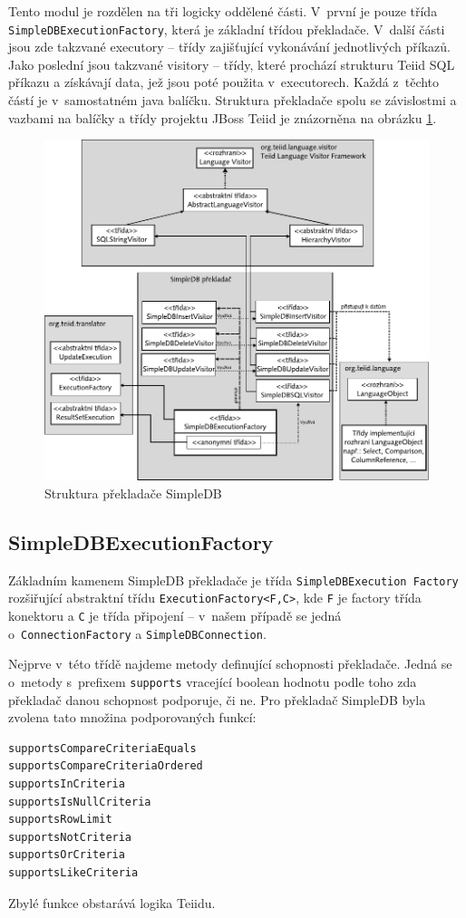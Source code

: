 \documentclass[oneside,12pt]{fithesis2}
\begin{document}
Tento modul je rozdělen na tři logicky oddělené části. V~první je pouze třída \texttt{SimpleDBExecutionFactory}, která je základní třídou překladače. V~další části jsou zde takzvané executory -- třídy zajišťující vykonávání jednotlivých příkazů. Jako poslední jsou takzvané visitory -- třídy, které prochází strukturu Teiid SQL příkazu a získávají data, jež jsou poté použita v~executorech. Každá z~těchto částí je v~samostatném java balíčku. Struktura překladače spolu se závislostmi a vazbami na balíčky a třídy projektu JBoss Teiid je znázorněna na obrázku \ref{translatorStructure}.
\begin{figure}[h]
 \centering
 \includegraphics[scale=0.8]{TranslatorStructure}
 \caption{Struktura překladače SimpleDB}
 \label{translatorStructure}
\end{figure}
\subsection{SimpleDBExecutionFactory}
Základním kamenem SimpleDB překladače je třída \texttt{SimpleDBExecution Factory} rozšiřující abstraktní třídu \texttt{ExecutionFactory<F,C>}, kde \texttt{F} je factory třída konektoru a \texttt{C} je třída připojení -- v~našem případě se jedná o~\texttt{ConnectionFactory} a \texttt{SimpleDBConnection}.

Nejprve v~této třídě najdeme metody definující schopnosti překladače. Jedná se o~metody s~prefixem \texttt{supports} vracející boolean hodnotu podle toho zda překladač danou schopnost podporuje, či ne. Pro překladač SimpleDB byla zvolena tato množina podporovaných funkcí: 
\begin{verbatim}
supportsCompareCriteriaEquals
supportsCompareCriteriaOrdered
supportsInCriteria
supportsIsNullCriteria
supportsRowLimit
supportsNotCriteria
supportsOrCriteria
supportsLikeCriteria
\end{verbatim}
Zbylé funkce obstarává logika Teiidu.
\end{document}

